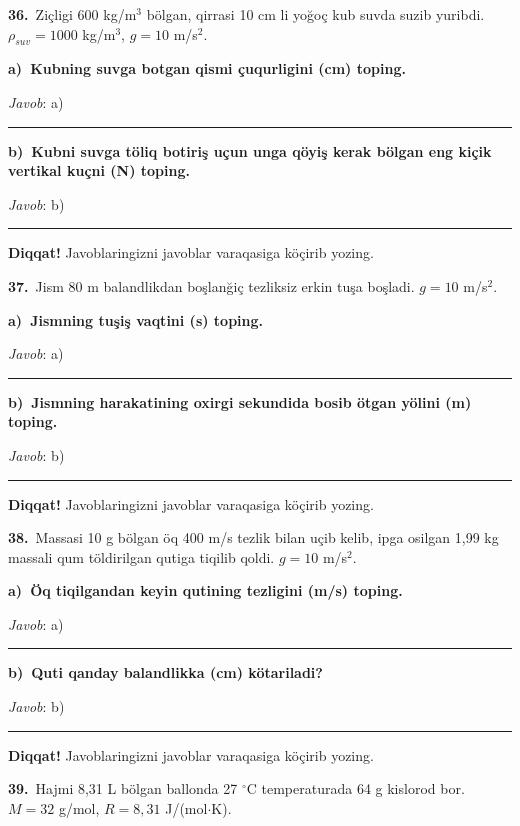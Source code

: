 \documentclass[11pt,a4paper]{article}
\newcommand{\blank}{\rule{5cm}{0.4pt}}
\begin{document}
\noindent\textbf{36.}\ Ziçligi 600 kg/m$^3$ bölgan, qirrasi 10 cm li yoğoç kub suvda suzib yuribdi. $\rho_{suv}=1000$ kg/m$^3$, $g=10$ m/s$^2$.\par\smallskip
\medskip\noindent\textbf{a)\ Kubning suvga botgan qismi çuqurligini (cm) toping.}\par
\noindent\textit{Javob}: a)\ \blank\par
\medskip\noindent\textbf{b)\ Kubni suvga töliq botiriş uçun unga qöyiş kerak bölgan eng kiçik vertikal kuçni (N) toping.}\par
\noindent\textit{Javob}: b)\ \blank\par
\medskip\noindent\textbf{Diqqat!} Javoblaringizni javoblar varaqasiga köçirib yozing.\par\vspace{10pt}
\noindent\textbf{37.}\ Jism 80 m balandlikdan boşlanğiç tezliksiz erkin tuşa boşladi. $g=10$ m/s$^2$.\par\smallskip
\medskip\noindent\textbf{a)\ Jismning tuşiş vaqtini (s) toping.}\par
\noindent\textit{Javob}: a)\ \blank\par
\medskip\noindent\textbf{b)\ Jismning harakatining oxirgi sekundida bosib ötgan yölini (m) toping.}\par
\noindent\textit{Javob}: b)\ \blank\par
\medskip\noindent\textbf{Diqqat!} Javoblaringizni javoblar varaqasiga köçirib yozing.\par\vspace{10pt}
\noindent\textbf{38.}\ Massasi 10 g bölgan öq 400 m/s tezlik bilan uçib kelib, ipga osilgan 1,99 kg massali qum töldirilgan qutiga tiqilib qoldi. $g=10$ m/s$^2$.\par\smallskip
\medskip\noindent\textbf{a)\ Öq tiqilgandan keyin qutining tezligini (m/s) toping.}\par
\noindent\textit{Javob}: a)\ \blank\par
\medskip\noindent\textbf{b)\ Quti qanday balandlikka (cm) kötariladi?}\par
\noindent\textit{Javob}: b)\ \blank\par
\medskip\noindent\textbf{Diqqat!} Javoblaringizni javoblar varaqasiga köçirib yozing.\par\vspace{10pt}
\noindent\textbf{39.}\ Hajmi 8,31 L bölgan ballonda 27 $^\circ$C temperaturada 64 g kislorod bor. $M=32$ g/mol, $R=8{,}31$ J/(mol$\cdot$K).\par\smallskip
\end{document}
